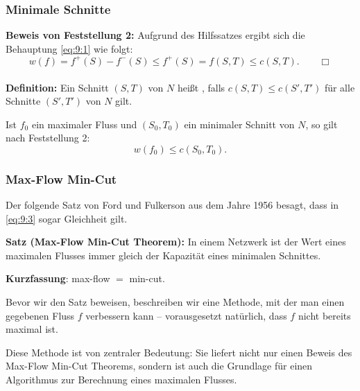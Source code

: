 \documentclass[smaller]{beamer}
\begin{document}
\begin{frame}
 \frametitle{Minimale Schnitte}
 \textbf{Beweis von Feststellung 2:} Aufgrund des Hilfssatzes ergibt sich die Behauptung \eqref{eq:9:1} wie folgt:
\[
w(f) = f^+(S) - f^-(S) \leq f^+(S) = f(S,T) \leq c(S,T). \qquad \Box
\]\\
\vspace*{0.2cm}
\textbf{Definition:} Ein Schnitt $(S,T)$ von $N$ heißt , falls $c(S,T) \leq c(S',T')$ für alle Schnitte $(S',T')$ von $N$ gilt. \\ \vspace*{0.2cm}

Ist $f_0$ ein maximaler Fluss und $(S_0,T_0)$ ein minimaler Schnitt von $N$, so gilt nach Feststellung 2:
\begin{equation}
\label{eq:9:3}
w(f_0) \leq c(S_0,T_0).
\end{equation}
\end{frame}

\begin{frame}
 \frametitle{Max-Flow Min-Cut}
 Der folgende \alert{Satz von Ford und Fulkerson} aus dem Jahre 1956 besagt, dass in \eqref{eq:9:3} sogar Gleichheit gilt. \\ \vspace*{0.2cm}

\textbf{Satz (Max-Flow Min-Cut Theorem):} 
In einem Netzwerk ist der Wert eines maximalen Flusses immer gleich der Kapazität eines minimalen Schnittes. \\ \vspace*{0.2cm}

\textbf{Kurzfassung}: max-flow $=$ min-cut. \\ \vspace*{0.2cm}

Bevor wir den Satz beweisen, beschreiben wir eine \alert{Methode, mit der man einen gegebenen Fluss $f$ verbessern kann} -- vorausgesetzt natürlich, dass $f$ nicht bereits maximal ist. \\ \vspace*{0.2cm}

\alert{Diese Methode ist von zentraler Bedeutung}: Sie liefert nicht nur einen Beweis des Max-Flow Min-Cut Theorems, sondern ist auch die Grundlage für einen \alert{Algorithmus} zur Berechnung eines maximalen Flusses.
\end{frame}
\end{document}
